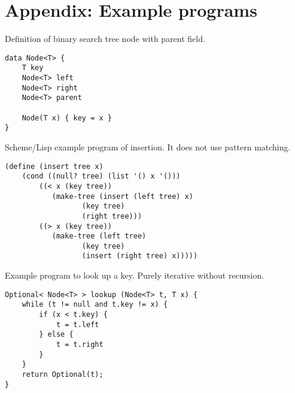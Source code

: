 \documentclass[b5paper]{article}
\begin{document}
\section{Appendix: Example programs}

Definition of binary search tree node with parent field.

\lstset{language=Bourbaki, frame=single}
\begin{lstlisting}
data Node<T> {
    T key
    Node<T> left
    Node<T> right
    Node<T> parent

    Node(T x) { key = x }
}
\end{lstlisting}

Scheme/Lisp example program of insertion. It does not use pattern matching.

\lstset{language=Lisp}
\begin{lstlisting}
(define (insert tree x)
    (cond ((null? tree) (list '() x '()))
        ((< x (key tree))
           (make-tree (insert (left tree) x)
                  (key tree)
                  (right tree)))
        ((> x (key tree))
           (make-tree (left tree)
                  (key tree)
                  (insert (right tree) x)))))
\end{lstlisting}

Example program to look up a key. Purely iterative without recursion.

\lstset{language=Bourbaki}
\begin{lstlisting}
Optional< Node<T> > lookup (Node<T> t, T x) {
    while (t != null and t.key != x) {
        if (x < t.key) {
            t = t.left
        } else {
            t = t.right
        }
    }
    return Optional(t);
}
\end{lstlisting}
\end{document}
